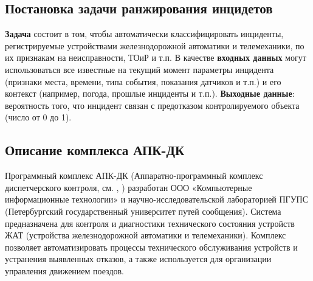 \subsection{Постановка задачи ранжирования инцидетов}
\textbf{Задача} состоит в том, чтобы автоматически классифицировать инциденты, регистрируемые устройствами железнодорожной автоматики и телемеханики,  по их признакам на неисправности, ТОиР и т.п. В качестве \textbf{входных данных} могут использоваться все известные на текущий момент параметры инцидента (признаки места, времени, типа события, показания датчиков и т.п.) и его контекст (например, погода, прошлые инциденты и т.п.). \textbf{Выходные данные}: вероятность того, что инцидент связан с предотказом контролируемого объекта (число от 0 до 1).

\subsection{Описание комплекса АПК-ДК}
Программный комплекс АПК-ДК (Аппаратно-программный комплекс диспетчерского контроля, см. \cite{apk-dk-volkov}, \cite{apk-dk-piter}) разработан ООО «Компьютерные информационные технологии» и научно-исследовательской лабораторией ПГУПС (Петербургский государственный университет путей сообщения).  Система предназначена для контроля и диагностики технического состояния устройств ЖАТ (устройства железнодорожной автоматики и телемеханики).  Комплекс позволяет автоматизировать процессы технического обслуживания устройств и устранения выявленных отказов, а также используется для организации управления движением поездов.

